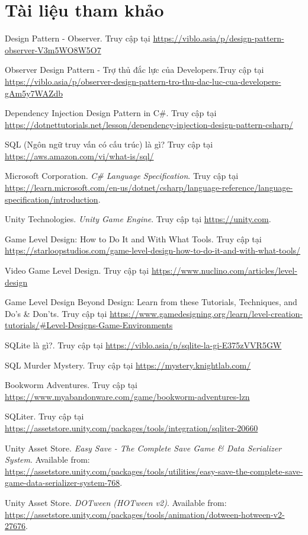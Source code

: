 \section{Tài liệu tham khảo}
\begin{thebibliography}{1}
		
	Design Pattern - Observer. Truy cập tại \url{https://viblo.asia/p/design-pattern-observer-V3m5WO8W5O7}
	
	Observer Design Pattern - Trợ thủ đắc lực của Developers.Truy cập tại
	\url{https://viblo.asia/p/observer-design-pattern-tro-thu-dac-luc-cua-developers-gAm5y7WAZdb}

	
	 Dependency Injection Design Pattern in C\#. Truy cập tại \url{https://dotnettutorials.net/lesson/dependency-injection-design-pattern-csharp/}
	
	SQL (Ngôn ngữ truy vấn có cấu trúc) là gì? Truy cập tại \url{https://aws.amazon.com/vi/what-is/sql/}
	
	Microsoft Corporation. \textit{C\# Language Specification}. Truy cập tại \url{https://learn.microsoft.com/en-us/dotnet/csharp/language-reference/language-specification/introduction}.
	
	Unity Technologies. \textit{Unity Game Engine}. Truy cập tại \url{https://unity.com}.
	
	
	 Game Level Design: How to Do It and With What Tools. Truy cập tại \url{https://starloopstudios.com/game-level-design-how-to-do-it-and-with-what-tools/}
	
	 Video Game Level Design. Truy cập tại \url{https://www.nuclino.com/articles/level-design}
	
	 Game Level Design Beyond Design: Learn from these Tutorials, Techniques, and Do’s \& Don’ts. Truy cập tại \url{https://www.gamedesigning.org/learn/level-creation-tutorials/#Level-Designs-Game-Environments}
	
	 SQLite là gì?. Truy cập tại \url{https://viblo.asia/p/sqlite-la-gi-E375zVVR5GW}
	
	 SQL Murder Mystery. Truy cập tại \url{https://mystery.knightlab.com/}
	
	 Bookworm Adventures. Truy cập tại \url{https://www.myabandonware.com/game/bookworm-adventures-lzn}
	
	 SQLiter. Truy cập tại \url{https://assetstore.unity.com/packages/tools/integration/sqliter-20660}

	Unity Asset Store. \textit{Easy Save - The Complete Save Game \& Data Serializer System}. Available from: \url{https://assetstore.unity.com/packages/tools/utilities/easy-save-the-complete-save-game-data-serializer-system-768}.
	
	Unity Asset Store. \textit{DOTween (HOTween v2)}. Available from: \url{https://assetstore.unity.com/packages/tools/animation/dotween-hotween-v2-27676}.
	
	
	
\end{thebibliography}